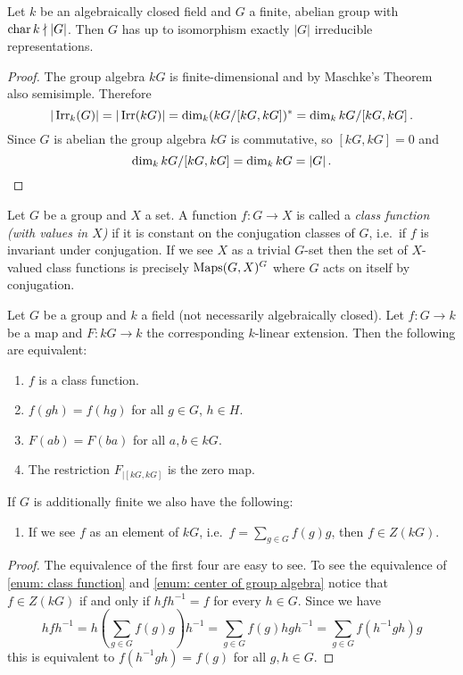 \begin{corollary}\label{corollary: number of irreducible representations of finite abelian group}
  Let $k$ be an algebraically closed field and $G$ a finite, abelian group with $\operatorname{char} k \nmid |G|$.
  Then $G$ has up to isomorphism exactly $|G|$ irreducible representations.
\end{corollary}
\begin{proof}
  The group algebra $kG$ is finite-dimensional and by Maschke’s Theorem also semisimple.
  Therefore
  \[
      |\operatorname{Irr}_k(G)|
    = |\operatorname{Irr}(kG)|
    = \dim_k (kG/[kG, kG])^*
    = \dim_k kG/[kG, kG] \,.
  \]
  Since $G$ is abelian the group algebra $kG$ is commutative, so $[kG,kG] = 0$ and
  \[
      \dim_k kG/[kG, kG]
    = \dim_k kG
    = |G| \,.
    \qedhere
  \]
\end{proof}


\begin{definition}
  Let $G$ be a group and $X$ a set.
  A function $f \colon G \to X$ is called a \emph{class function (with values in $X$)} if it is constant on the conjugation classes of $G$, i.e.\ if $f$ is invariant under conjugation.
  If we see $X$ as a trivial $G$-set then the set of $X$-valued class functions is precisely $\operatorname{Maps}(G,X)^G$ where $G$ acts on itself by conjugation.
\end{definition}


\begin{lemma} \label{lemma: characterisation class functions}
  Let $G$ be a group and $k$ a field (not necessarily algebraically closed).
  Let $f \colon G \to k$ be a map and $F \colon kG \to k$ the corresponding $k$-linear extension.
  Then the following are equivalent:
  \begin{enumerate}[label=\emph{\roman*)}, leftmargin=*]
    \item \label{enum: class function}
      $f$ is a class function.
    \item
      $f(gh) = f(hg)$ for all $g \in G$, $h \in H$.
    \item
      $F(ab) = F(ba)$ for all $a, b \in kG$.
    \item
      The restriction $F_{|[kG,kG]}$ is the zero map.
  \end{enumerate}
  If $G$ is additionally finite we also have the following:
  \begin{enumerate}[label=\emph{\roman*)}, leftmargin=*, resume]
    \item \label{enum: center of group algebra}
      If we see $f$ as an element of $kG$, i.e.\ $f = \sum_{g \in G} f(g) g$, then $f \in Z(kG)$.
  \end{enumerate}
\end{lemma}
\begin{proof}
  The equivalence of the first four are easy to see.
  To see the equivalence of \ref{enum: class function} and \ref{enum: center of group algebra} notice that $f \in Z(kG)$ if and only if $hfh^{-1} = f$ for every $h \in G$.
  Since we have
    \[
        h f h^{-1}
      = h\left( \sum_{g \in G} f(g) g \right) h^{-1}
      = \sum_{g \in G} f(g) hgh^{-1}
      = \sum_{g \in G} f(h^{-1} g h) g
    \]
    this is equivalent to $f(h^{-1} g h) = f(g)$ for all $g, h \in G$.
\end{proof}


